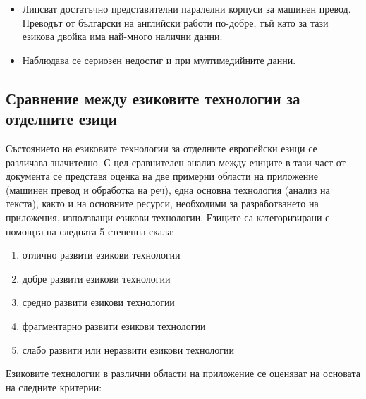 \documentclass[]{../../metanetpaper}
\begin{document}
\begin{multicols}{2}
\begin{itemize}
\item Липсват достатъчно представителни паралелни корпуси за машинен
  превод. Преводът от български на английски работи по-добре, тъй като
  за тази езикова двойка има най-много налични данни.

\item Наблюдава се сериозен недостиг и при мултимедийните данни.
\end{itemize}

\subsection{Сравнение между езиковите технологии за отделните езици}

Състоянието на езиковите технологии за отделните европейски езици се различава значително. С цел сравнителен анализ между езиците в тази част от документа се представя оценка на две примерни области на приложение (машинен превод и обработка на реч), една основна технология (анализ на текста), както и на основните ресурси, необходими за разработването на приложения, използващи езикови технологии.
Езиците са категоризирани с помощта на следната 5-степенна скала:

\begin{enumerate}
\item отлично развити езикови технологии
\item добре развити езикови технологии
\item средно развити езикови технологии
\item фрагментарно развити езикови технологии
\item слабо развити или неразвити езикови технологии
\end{enumerate}

Езиковите технологии в различни области на приложение се оценяват на
основата на следните критерии:


\end{multicols}
\end{document}
